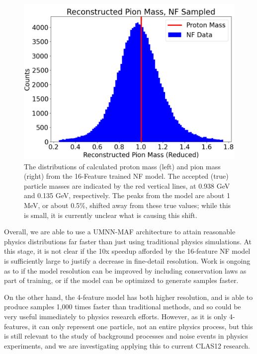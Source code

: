 \begin{figure}[H]
\begin{minipage}{0.421245\textwidth}
                \includegraphics[width=.97\textwidth,trim={ 0 0 0 0},clip]{Chapters/Ch3-Simulations/normalizing_flows/pics/FinalPictures/updated_pion_reduced.png}
            \end{minipage}
                \caption[Placeholder Short text]{The distributions of calculated proton mass (left) and pion mass (right) from the 16-Feature trained NF model.  The accepted (true) particle masses are indicated by the red vertical lines, at 0.938 GeV and 0.135 GeV, respectively.
                The peaks from the model are about 1 MeV, or about 0.5\%, shifted away from these true values; while this is small, it is currently unclear what is causing this shift.}
            \label{fig:protonspions}
        \end{figure}
        
        
        Overall, we are able to use a UMNN-MAF architecture to attain reasonable physics distributions far faster than just using traditional physics simulations. At this stage, it is not clear if the 10x speedup afforded by the 16-feature NF model is sufficiently large to justify a decrease in fine-detail resolution. Work is ongoing as to if the model resolution can be improved by including conservation laws as part of training, or if the model can be optimized to generate samples faster. 
        
        On the other hand, the 4-feature model has both higher resolution, and is able to produce samples 1,000 times faster than traditional methods, and so could be very useful immediately to physics research efforts. However, as it is only 4-features, it can only represent one particle, not an entire physics process, but this is still relevant to the study of background processes and noise events in physics experiments, and we are investigating applying this to current CLAS12 research.
        
